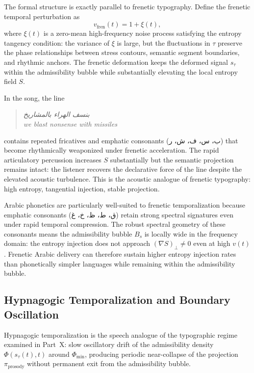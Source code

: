 \documentclass[12pt, a4paper]{article}
\theoremstyle{essaystyle}
\begin{document}
The formal structure is exactly parallel to frenetic typography. Define the frenetic
temporal perturbation as
\[
v_{\mathrm{fren}}(t) = 1 + \xi(t),
\]
where $\xi(t)$ is a zero-mean high-frequency noise process satisfying the entropy
tangency condition: the variance of $\xi$ is large, but the fluctuations in $\tau$
preserve the phase relationships between stress contours, semantic segment boundaries,
and rhythmic anchors. The frenetic deformation keeps the deformed signal $s_\tau$
within the admissibility bubble while substantially elevating the local entropy field $S$.

In the song, the line

\begin{quote}
\textit{بنسف الهراء بالمشاريخ} \\
\textit{we blast nonsense with missiles}
\end{quote}

contains repeated fricatives and emphatic consonants (ب، س، ف، ش، ر) that become
rhythmically weaponized under frenetic acceleration. The rapid articulatory percussion
increases $S$ substantially but the semantic projection remains intact: the listener
recovers the declarative force of the line despite the elevated acoustic turbulence.
This is the acoustic analogue of frenetic typography: high entropy, tangential injection,
stable projection.

Arabic phonetics are particularly well-suited to frenetic temporalization because
emphatic consonants (ق، ط، ظ، خ، غ) retain strong spectral signatures even under
rapid temporal compression. The robust spectral geometry of these consonants means
the admissibility bubble $B_s$ is locally wide in the frequency domain: the entropy
injection does not approach $(\nabla S)_\perp \neq 0$ even at high $v(t)$.
Frenetic Arabic delivery can therefore sustain higher entropy injection rates than
phonetically simpler languages while remaining within the admissibility bubble.

\subsection{Hypnagogic Temporalization and Boundary Oscillation}

Hypnagogic temporalization is the speech analogue of the typographic regime examined
in Part~X: slow oscillatory drift of the admissibility density $\Phi(s_\tau(t), t)$
around $\Phi_{\min}$, producing periodic near-collapse of the projection
$\pi_{\mathrm{prosody}}$ without permanent exit from the admissibility bubble.
\end{document}
